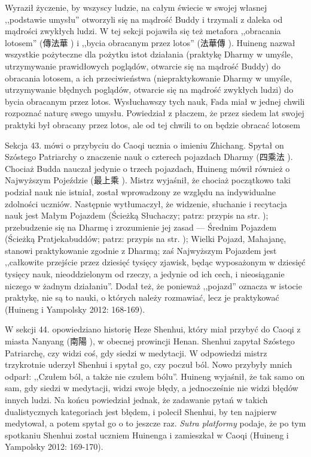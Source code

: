 Wyraził życzenie, by wszyscy ludzie, na całym świecie w swojej własnej ,,podstawie umysłu''  otworzyli się na mądrość Buddy i trzymali z daleka od mądrości zwykłych ludzi.
W tej sekcji pojawiła się też metafora ,,obracania lotosem'' (傳法華 ) i ,,bycia obracanym przez lotos'' (法華傳 ).
Huineng nazwał wszystkie pożyteczne dla pożytku istot działania (praktykę Dharmy w umyśle, utrzymywanie prawidłowych poglądów, otwarcie się na mądrość Buddy) do obracania lotosem, a ich przeciwieństwa (niepraktykowanie Dharmy w umyśle, utrzymywanie błędnych poglądów, otwarcie się na mądrość zwykłych ludzi) do bycia obracanym przez lotos.
Wysłuchawszy tych nauk, Fada miał w jednej chwili rozpoznać naturę swego umysłu.
Powiedział z płaczem, że przez siedem lat swojej praktyki był obracany przez lotos, ale od tej chwili to on będzie obracać lotosem\ibid

Sekcja 43. mówi o przybyciu do Caoqi ucznia o imieniu Zhichang.
Spytał on Szóstego Patriarchy o znaczenie nauk o czterech pojazdach Dharmy (四乘法 ).\label{SiChengFa}
Chociaż Budda nauczał jedynie o trzech pojazdach, Huineng mówił również o Najwyższym Pojeździe (最上乘 ).
Mistrz wyjaśnił, że chociaż początkowo taki podział nauk nie istniał, został wprowadzony ze względu na indywidualne zdolności uczniów.
Następnie wytłumaczył, że widzenie, słuchanie i recytacja nauk jest Małym Pojazdem (Ścieżką Słuchaczy; patrz: przypis na str. \pageref{Triyana});
przebudzenie się na Dharmę i zrozumienie jej zasad --- Średnim Pojazdem (Ścieżką Pratjekabuddów; patrz: przypis na str. \pageref{Triyana});
Wielki Pojazd, Mahajanę, stanowi praktykowanie zgodnie z Dharmą; zaś Najwyższym Pojazdem jest ,,całkowite przejście przez dziesięć tysięcy zjawisk, będąc wyposażonym w dziesięć tysięcy nauk, nieoddzielonym od rzeczy, a jedynie od ich cech, i nieosiąganie niczego w żadnym działaniu''.
Dodał też, że ponieważ ,,pojazd'' oznacza w istocie praktykę, nie są to nauki, o których należy rozmawiać, lecz je praktykować
(Huineng i Yampolsky 2012: 168-169).

W sekcji 44. opowiedziano historię Heze Shenhui, który miał przybyć do Caoqi z miasta Nanyang (南陽 ), w obecnej prowincji Henan.
Shenhui zapytał Szóstego Patriarchę, czy widzi coś, gdy siedzi w medytacji.
W odpowiedzi mistrz trzykrotnie uderzył Shenhui i spytał go, czy poczuł ból.
Nowo przybyły mnich odparł: ,,Czułem ból, a także nie czułem bólu''.
Huineng wyjaśnił, że tak samo on sam, gdy siedzi w medytacji, widzi swoje błędy, a jednocześnie nie widzi błędów innych ludzi.
Na końcu powiedział jednak, że zadawanie pytań w takich dualistycznych kategoriach jest błędem, i polecił Shenhui, by ten najpierw medytował, a potem spytał go o to jeszcze raz.
\textit{Sutra platformy} podaje, że po tym spotkaniu Shenhui został uczniem Huinenga i zamieszkał w Caoqi
(Huineng i Yampolsky 2012: 169-170).

